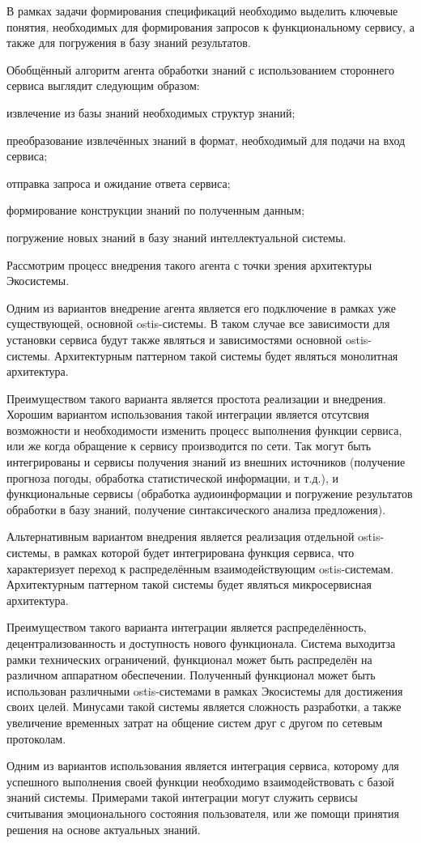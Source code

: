 В рамках задачи формирования спецификаций необходимо выделить ключевые понятия, необходимых для формирования запросов к функциональному сервису, а также для погружения в базу знаний результатов.

Обобщённый алгоритм агента обработки знаний с использованием стороннего сервиса выглядит следующим образом:
\begin{textitemize}
    \item извлечение из базы знаний необходимых структур знаний;
    \item преобразование извлечённых знаний в формат, необходимый для подачи на вход сервиса;
    \item отправка запроса и ожидание ответа сервиса;
    \item формирование конструкции знаний по полученным данным;
    \item погружение новых знаний в базу знаний интеллектуальной системы.
\end{textitemize}

Рассмотрим процесс внедрения такого агента с точки зрения архитектуры Экосистемы. 

Одним из вариантов внедрение агента является его подключение в рамках уже существующей, основной ostis-системы. В таком случае все зависимости для установки сервиса будут также являться и зависимостями основной ostis-системы. Архитектурным паттерном такой системы будет являться монолитная архитектура. 

Преимуществом такого варианта является простота реализации и внедрения. Хорошим вариантом использования такой интеграции является отсутсвия возможности и необходимости изменить процесс выполнения функции сервиса, или же когда обращение к сервису производится по сети. Так могут быть интегрированы и сервисы получения знаний из внешних источников (получение прогноза погоды, обработка статистической информации, и т.д.), и функциональные сервисы (обработка аудиоинформации и погружение результатов обработки в базу знаний, получение синтаксического анализа предложения). 

Альтернативным вариантом внедрения является реализация отдельной ostis-системы, в рамках которой будет интегрирована функция сервиса, что характеризует переход к распределённым взаимодействующим ostis-системам. Архитектурным паттерном такой системы будет являться микросервисная архитектура.

Преимуществом такого варианта интеграции является распределённость, децентрализованность и доступность нового функционала. Система выходитза рамки технических ограничений, функционал может быть распределён на различном аппаратном обеспечении. Полученный функционал может быть использован различными ostis-системами в рамках Экосистемы для достижения своих целей. Минусами такой системы является сложность разработки, а также увеличение временных затрат на общение систем друг с другом по сетевым протоколам. 

Одним из вариантов использования является интеграция сервиса, которому для успешного выполнения своей функции необходимо взаимодействовать с базой знаний системы. Примерами такой интеграции могут служить сервисы считывания эмоционального состояния пользователя, или же помощи принятия решения на основе актуальных знаний.
